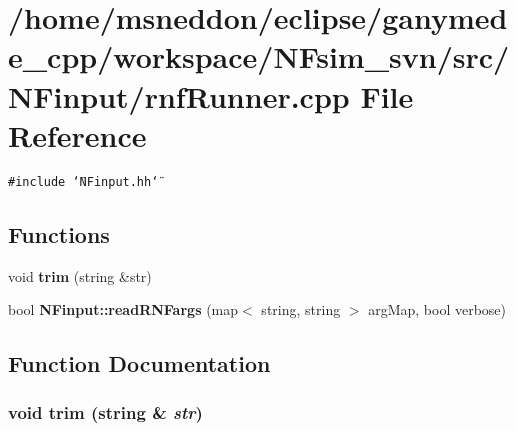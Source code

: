 \section{/home/msneddon/eclipse/ganymede\_\-cpp/workspace/NFsim\_\-svn/src/NFinput/rnfRunner.cpp File Reference}
\label{rnfRunner_8cpp}


{\tt \#include \char`\"{}NFinput.hh\char`\"{}}\par
\subsection*{Functions}
\begin{CompactItemize}
\item 
void {\bf trim} (string \&str)
\item 
bool {\bf NFinput::readRNFargs} (map$<$ string, string $>$ argMap, bool verbose)
\end{CompactItemize}


\subsection{Function Documentation}
\subsubsection{\setlength{\rightskip}{0pt plus 5cm}void trim (string \& {\em str})}\label{rnfRunner_8cpp_aaf0da6a7f3fe16c549dcd9aa611797a}


